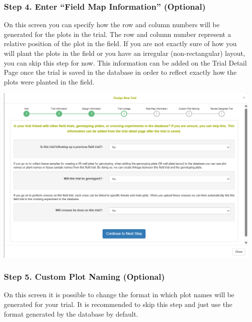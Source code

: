 \documentclass[
  12pt,
]{book}
\begin{document}
\hypertarget{step-4.-enter-field-map-information-optional}{%
\subsubsection*{Step 4. Enter ``Field Map Information'' (Optional)}\label{step-4.-enter-field-map-information-optional}}


On this screen you can specify how the row and column numbers will be generated for the plots in the trial. The row and column number represent a relative position of the plot in the field. If you are not exactly sure of how you will plant the plots in the field or you have an irregular (non-rectangular) layout, you can skip this step for now. This information can be added on the Trial Detail Page once the trial is saved in the database in order to reflect exactly how the plots were planted in the field.

\begin{center}\includegraphics[width=0.95\linewidth]{assets/images/trial_create_form_4} \end{center}

\hypertarget{step-5.-custom-plot-naming-optional}{%
\subsubsection*{Step 5. Custom Plot Naming (Optional)}\label{step-5.-custom-plot-naming-optional}}


On this screen it is possible to change the format in which plot names will be generated for your trial. It is recommended to skip this step and just use the format generated by the database by default.
\end{document}
